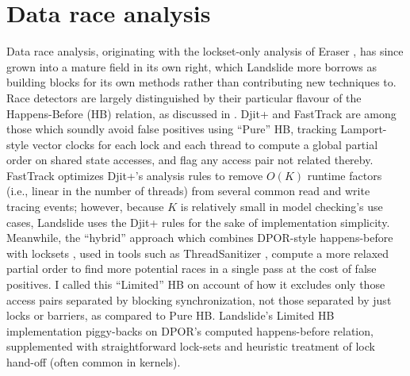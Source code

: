 

\section{Data race analysis}

Data race analysis, originating with the lockset-only analysis of Eraser \cite{eraser},
has since grown into a mature field in its own right,
which Landslide more borrows as building blocks for its own methods rather than contributing new techniques to.
Race detectors are largely distinguished by their particular flavour of the Happens-Before (HB) relation,
as discussed in \sect{\ref{sec:background-hb}}.
Djit+ \cite{djit} and FastTrack \cite{fasttrack} are among those
which soundly avoid false positives using ``Pure'' HB,
tracking Lamport-style vector clocks \cite{lamport-clocks}
for each lock and each thread to compute a global partial order on shared state accesses,
and flag any access pair not related thereby.
FastTrack optimizes Djit+'s analysis rules to remove $O(K)$ runtime factors (i.e., linear in the number of threads)
from several common read and write tracing events;
however, because $K$ is relatively small in model checking's use cases,
Landslide uses the Djit+ rules for the sake of implementation simplicity.
Meanwhile, the ``hybrid'' approach which combines DPOR-style happens-before with locksets \cite{hybriddatarace},
used in tools such as ThreadSanitizer \cite{tsan},
compute a more relaxed partial order to find more potential races in a single pass at the cost of false positives.
I called this ``Limited'' HB on account of how it excludes only those access pairs separated by blocking synchronization,
not those separated by just locks or barriers,
as compared to Pure HB.
Landslide's Limited HB implementation piggy-backs on DPOR's computed happens-before relation,
supplemented with straightforward lock-sets and heuristic treatment of lock hand-off
(often common in kernels).

